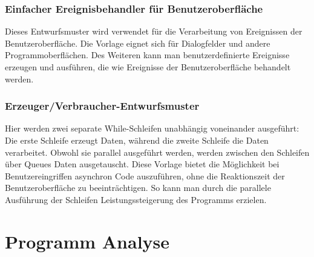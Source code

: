 \subsubsection{Einfacher Ereignisbehandler für Benutzeroberfläche}
Dieses Entwurfsmuster wird verwendet für die Verarbeitung von Ereignissen der Benutzeroberfläche. Die Vorlage eignet sich für Dialogfelder und andere Programmoberflächen. Des Weiteren kann man benutzerdefinierte Ereignisse erzeugen und ausführen, die wie Ereignisse der Benutzeroberfläche behandelt werden.

\subsubsection{Erzeuger/Verbraucher-Entwurfsmuster} %
Hier werden zwei separate While-Schleifen unabhängig voneinander ausgeführt: Die erste Schleife erzeugt Daten, während die zweite Schleife die Daten verarbeitet. Obwohl sie parallel ausgeführt werden, werden zwischen den Schleifen über Queues Daten ausgetauscht.
Diese Vorlage bietet die Möglichkeit bei Benutzereingriffen asynchron Code auszuführen, ohne die Reaktionszeit der Benutzeroberfläche zu beeinträchtigen. 
So kann man durch die parallele Ausführung der Schleifen Leistungssteigerung des Programms erzielen. 

		
		
\section{Programm Analyse}
